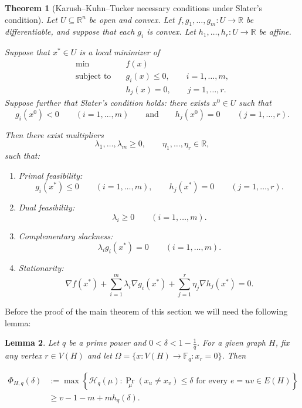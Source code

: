\documentclass[12pt]{article}
\newtheorem{theorem}{Theorem}
\newtheorem{lemma}[theorem]{Lemma}
\newcommand{\Fq}{\mathbb{F}_q}
\begin{document}
\begin{theorem}[Karush--Kuhn--Tucker necessary conditions under Slater's condition]
\label{thm: kkt-slater}
Let \(U\subseteq\mathbb R^n\) be open and convex. Let $f,g_1,\dots,g_m:U\to\mathbb R$ be differentiable, and suppose that each \(g_i\) is convex. Let $h_1,\dots,h_r:U\to\mathbb R$ be affine.

Suppose that \(x^*\in U\) is a local minimizer of
\[
\begin{aligned}
\min\quad & f(x)\\
\text{subject to}\quad
& g_i(x)\leq 0,\qquad i=1,\dots,m,\\
& h_j(x)=0,\qquad j=1,\dots,r.
\end{aligned}
\]
Suppose further that Slater's condition holds: there exists
\(x^0\in U\) such that
\[
g_i(x^0)<0\qquad(i=1,\dots,m)\qquad\text{and}\qquad h_j(x^0)=0\qquad(j=1,\dots,r).
\]

Then there exist multipliers
\[
\lambda_1,\dots,\lambda_m\geq 0,
\qquad
\eta_1,\dots,\eta_r\in\mathbb R,
\]
such that:
\begin{enumerate}
\item[(i)] \emph{Primal feasibility:}
\[
g_i(x^*)\leq 0\qquad(i=1,\dots,m),
\qquad
h_j(x^*)=0\qquad(j=1,\dots,r).
\]

\item[(ii)] \emph{Dual feasibility:}
\[
\lambda_i\geq 0\qquad(i=1,\dots,m).
\]

\item[(iii)] \emph{Complementary slackness:}
\[
\lambda_i g_i(x^*)=0
\qquad(i=1,\dots,m).
\]

\item[(iv)] \emph{Stationarity:}
\[
\nabla f(x^*)
+\sum_{i=1}^m\lambda_i\nabla g_i(x^*)
+\sum_{j=1}^r\eta_j\nabla h_j(x^*)
=0.
\]
\end{enumerate}
\end{theorem}






Before the proof of the main theorem of this section we will need the following lemma:

\begin{lemma}
\label{lem: entropy-inequality}
Let $q$ be a prime power and $0<\delta<1-\frac1q$. For a given graph $H$, fix any vertex $r\in V(H)$ and let $\Omega=\{x:V(H)\to\Fq:x_r=0\}$. Then

\begin{align*}
    \Phi_{H,q}(\delta)&:= \max\left\{\mathcal H_q(\mu):\Pr_\mu(x_u\not=x_v)\leq\delta\text{ for every }e=uv\in E(H)\right\}\\
    &\ge v-1-m+mh_q(\delta).
\end{align*}

\end{lemma}
\end{document}
